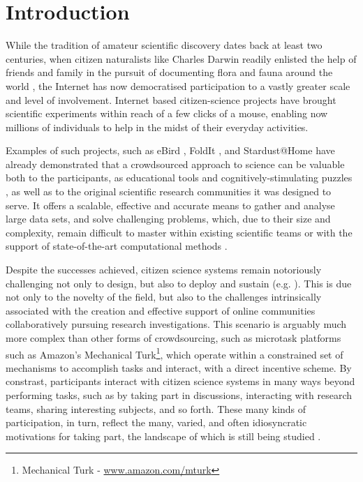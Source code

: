 \documentclass{sigchi}
\begin{document}

\section{Introduction}


While the tradition of amateur scientific discovery dates back at least two centuries, when citizen naturalists like Charles Darwin readily enlisted the help of friends and family in the pursuit of documenting flora and fauna around the world \cite{silvertown2009new}, the Internet has now democratised participation to a vastly greater scale and level of involvement.  Internet based citizen-science projects have brought scientific experiments within reach of a few clicks of a mouse, enabling now millions of individuals to help in the midst of their everyday activities.

Examples of such projects, such as eBird \cite{wood2011ebird}, FoldIt \cite{khatib2011algorithm}, and Stardust@Home \cite{westphal2005stardust} have already demonstrated that a crowdsourced approach to science can be valuable both to the participants, as educational tools and cognitively-stimulating puzzles \cite{gray2012lessons}, as well as to the original scientific research communities it was designed to serve. It offers a scalable, effective and accurate means to gather and analyse large data sets, and solve challenging problems, which, due to their size and complexity, remain difficult to master within existing scientific teams or with the support of state-of-the-art computational methods \cite{fortson2011galaxy,lintott2008galaxy,simpson2013dynamic}. %


Despite the successes achieved, citizen science systems remain notoriously challenging not only to design, but also to deploy and sustain (e.g. \cite{ebird, ubiome, druschke2012failures}). This is due not only to the novelty of the field, but also to the challenges intrinsically associated with the creation and effective support of online communities collaboratively pursuing research investigations. This scenario is arguably much more complex than other forms of crowdsourcing, such as microtask platforms such as Amazon's Mechanical Turk\footnote{Mechanical Turk - \url{www.amazon.com/mturk}}, which operate within a constrained set of mechanisms to accomplish tasks and interact, with a direct incentive scheme. By constrast, participants  interact with citizen science systems in many ways beyond performing tasks, such as by taking part in discussions, interacting with research teams, sharing interesting subjects, and so forth.  These many kinds of participation, in turn, reflect the many, varied, and often idiosyncratic motivations for taking part, the landscape of which is still being studied \cite{raddick2010galaxy}.
\end{document}
